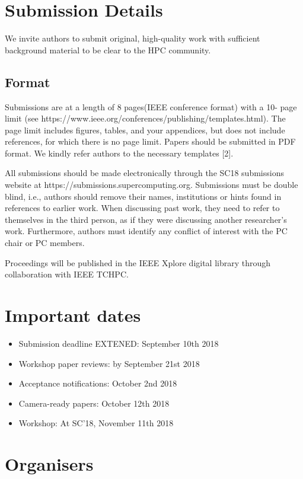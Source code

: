 \documentclass[11pt,a4paper]{article}
\begin{document}
\section{Submission Details}

We invite authors to submit original, high-quality work with
sufficient background material to be clear to the HPC
community. 
\subsection{Format}
Submissions are at a length of 8 pages(IEEE conference format) with a 10-
page limit (see https://www.ieee.org/conferences/publishing/templates.html). 
The page limit includes figures, tables, and your appendices, 
but does not include references, for which there is no page limit. 
Papers should be submitted in PDF format. We kindly refer authors to 
the necessary templates [2].

All submissions should be made electronically through the SC18 submissions 
website at https://submissions.supercomputing.org.  Submissions must be 
double blind, i.e., authors should remove their names, institutions or hints 
found in references to earlier work. When discussing past work, they need to refer to
themselves in the third person, as if they were discussing another
researcher's work. Furthermore, authors must identify any conflict of
interest with the PC chair or PC members.

Proceedings will be published in the IEEE Xplore digital
library through collaboration with IEEE TCHPC.

\section{Important dates}
\begin{itemize}
\item Submission deadline EXTENED: September 10th 2018
\item Workshop paper reviews: by September 21st 2018
\item Acceptance notifications: October 2nd 2018
\item Camera-ready papers: October 12th 2018
\item Workshop: At SC'18, November 11th 2018
\end{itemize}

\section{Organisers}
\end{document}
